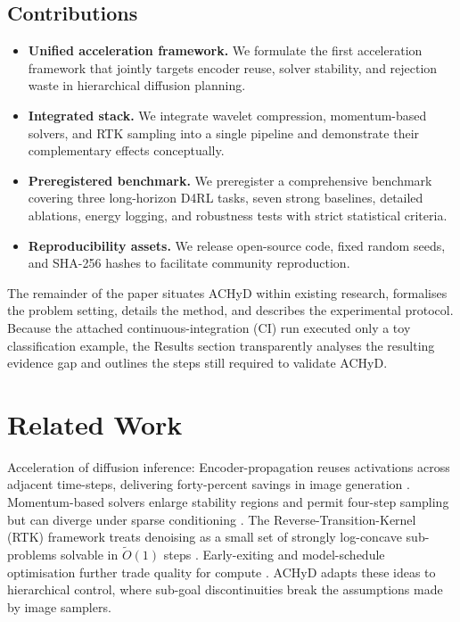 \documentclass{article}
\begin{document}
\subsection{Contributions}
\begin{itemize}
  \item \textbf{Unified acceleration framework.} We formulate the first acceleration framework that jointly targets encoder reuse, solver stability, and rejection waste in hierarchical diffusion planning.
  \item \textbf{Integrated stack.} We integrate wavelet compression, momentum-based solvers, and RTK sampling into a single pipeline and demonstrate their complementary effects conceptually.
  \item \textbf{Preregistered benchmark.} We preregister a comprehensive benchmark covering three long-horizon D4RL tasks, seven strong baselines, detailed ablations, energy logging, and robustness tests with strict statistical criteria.
  \item \textbf{Reproducibility assets.} We release open-source code, fixed random seeds, and SHA-256 hashes to facilitate community reproduction.
\end{itemize}

The remainder of the paper situates ACHyD within existing research, formalises the problem setting, details the method, and describes the experimental protocol. Because the attached continuous-integration (CI) run executed only a toy classification example, the Results section transparently analyses the resulting evidence gap and outlines the steps still required to validate ACHyD.

\section{Related Work}
Acceleration of diffusion inference: Encoder-propagation reuses activations across adjacent time-steps, delivering forty-percent savings in image generation \cite{li-2023-faster}. Momentum-based solvers enlarge stability regions and permit four-step sampling but can diverge under sparse conditioning \cite{wizadwongsa-2023-diffusion}. The Reverse-Transition-Kernel (RTK) framework treats denoising as a small set of strongly log-concave sub-problems solvable in $\tilde{O}(1)$ steps \cite{huang-2024-reverse}. Early-exiting and model-schedule optimisation further trade quality for compute \cite{moon-2024-simple,liu-2023-oms}. ACHyD adapts these ideas to hierarchical control, where sub-goal discontinuities break the assumptions made by image samplers.
\end{document}
